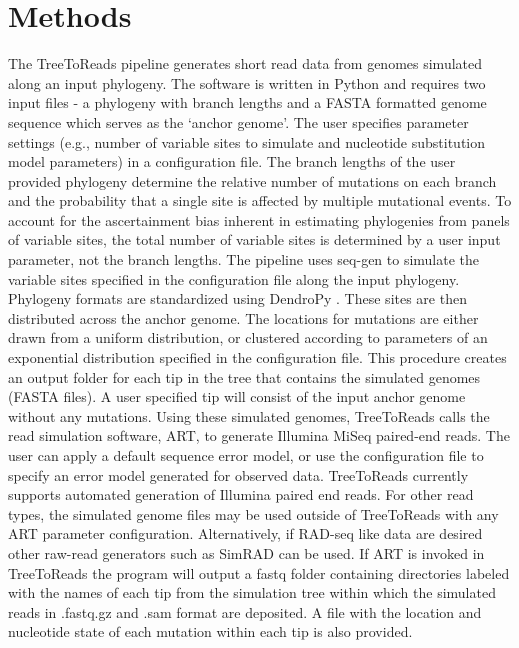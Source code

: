 \section*{Methods}
The TreeToReads pipeline generates short read data from genomes simulated along an input phylogeny. 
The software is written in Python and requires two input files - a phylogeny with branch lengths and a FASTA formatted genome sequence which serves as the `anchor genome'.
The user specifies parameter settings (e.g., number of variable sites to simulate and nucleotide substitution model parameters) in a configuration file.
The branch lengths of the user provided phylogeny determine the relative number of mutations on each branch 
and the probability that a single site is affected by multiple mutational events.
To account for the ascertainment bias inherent in estimating phylogenies from panels of variable sites, 
the total number of variable sites is determined by a user input parameter, not the branch lengths.
The pipeline uses seq-gen \citep{rambaut_seq-gen:_1997} to simulate the variable sites specified in the configuration file along the input phylogeny.
Phylogeny formats are standardized using DendroPy \cite{sukumaran_dendropy:_2010}.
These sites are then distributed across the anchor genome.
The locations for mutations are either drawn from a uniform distribution,
or clustered according to parameters of an exponential distribution specified in the configuration file. 
This procedure creates an output folder for each tip in the tree that contains the simulated genomes (FASTA files).
A user specified tip will consist of the input anchor genome without any mutations.
Using these simulated genomes, 
TreeToReads calls the read simulation software, ART, \citep{huang_art:_2012} to generate Illumina MiSeq paired-end reads.
The user can apply a default sequence error model, or use the configuration file to specify an error model generated for observed data.
TreeToReads currently supports automated generation of Illumina paired end reads.
For other read types, the simulated genome files may be used outside of TreeToReads with any ART parameter configuration. 
Alternatively, if RAD-seq like data are desired other raw-read generators such as SimRAD \citep{lepais_simrad:_2014} can be used. 
If ART is invoked in TreeToReads the program will output a fastq folder containing directories labeled with the names of each tip from the 
simulation tree within which the simulated reads in .fastq.gz and .sam format are deposited. 
A file with the location and nucleotide state of each mutation within each tip is also provided.


